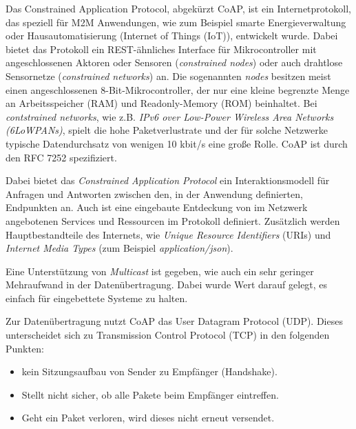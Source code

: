 Das Constrained Application Protocol, abgekürzt CoAP, ist ein Internetprotokoll, das speziell für M2M Anwendungen, wie zum Beispiel smarte Energieverwaltung oder Hausautomatisierung (Internet of Things (IoT)), entwickelt wurde. Dabei bietet das Protokoll ein REST-ähnliches Interface für Mikrocontroller mit angeschlossenen Aktoren oder Sensoren (\textit{constrained nodes}) oder auch drahtlose Sensornetze (\textit{constrained networks}) an. Die sogenannten \textit{nodes} besitzen meist einen angeschlossenen 8-Bit-Mikrocontroller, der nur eine kleine begrenzte Menge an Arbeitsspeicher (RAM) und Readonly-Memory (ROM) beinhaltet. Bei \textit{contstrained networks}, wie z.B. \textit{IPv6 over Low-Power Wireless Area Networks (6LoWPANs)}, spielt die hohe Paketverlustrate und der für solche Netzwerke typische Datendurchsatz von wenigen 10 kbit/s eine große Rolle. CoAP ist durch den RFC 7252 \autocite{RFC7252} spezifiziert.

Dabei bietet das \textit{Constrained Application Protocol} ein Interaktionsmodell für Anfragen und Antworten zwischen den, in der Anwendung definierten, Endpunkten an. Auch ist eine eingebaute Entdeckung von im Netzwerk angebotenen Services und Ressourcen im Protokoll definiert. Zusätzlich werden Hauptbestandteile des Internets, wie \textit{Unique Resource Identifiers} (URIs) und \textit{Internet Media Types} (zum Beispiel \textit{application/json}).

Eine Unterstützung von \textit{Multicast} ist gegeben, wie auch ein sehr geringer Mehraufwand in der Datenübertragung. Dabei wurde Wert darauf gelegt, es einfach für eingebettete Systeme zu halten.

Zur Datenübertragung nutzt CoAP das User Datagram Protocol (UDP). Dieses unterscheidet sich zu Transmission Control Protocol (TCP) in den folgenden Punkten:
\begin{itemize}
    \item kein Sitzungsaufbau von Sender zu Empfänger (Handshake).
    \item Stellt nicht sicher, ob alle Pakete beim Empfänger eintreffen.
    \item Geht ein Paket verloren, wird dieses nicht erneut versendet.
\end{itemize}

